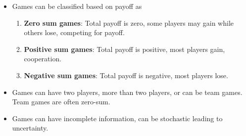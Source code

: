 \documentclass[a4paper]{article}
\begin{document}
\begin{itemize}
\begin{table}[H]
\begin{tabular}{|c|c|c|}
            \hline
        \end{tabular}
    \end{table}
    \item Games can be classified based on payoff as
    \begin{enumerate}
        \item \textbf{Zero sum games}: Total payoff is zero, some players may gain while others lose, competing for payoff.
        \item \textbf{Positive sum games}: Total payoff is positive, most players gain, cooperation.
        \item \textbf{Negative sum games}: Total payoff is negative, most players lose.
    \end{enumerate}
    \item Games can have two players, more than two players, or can be team games. Team games are often zero-sum.
    \item Games can have incomplete information, can be stochastic leading to uncertainty.
\end{itemize}
\end{document}
